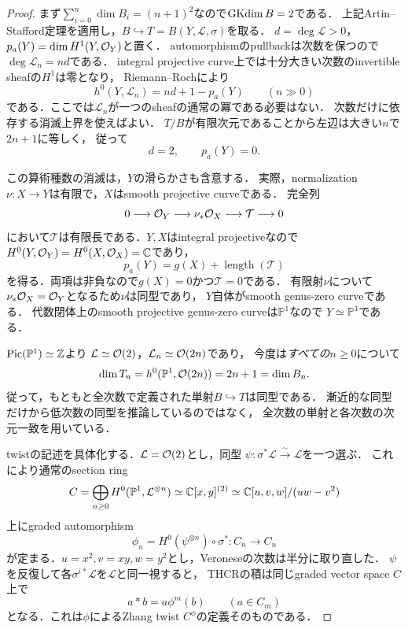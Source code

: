 \documentclass[11pt,a4paper]{ltjsarticle}
\begin{document}
\begin{proof}
まず$\sum_{i=0}^n\dim B_i=(n+1)^2$なので$\operatorname{GKdim} B=2$である．
上記Artin--Stafford定理を適用し，$B\hookrightarrow T=B(Y,\mathcal L,\sigma)$を取る．
$d=\deg\mathcal L>0$，$p_a(Y)=\dim H^1(Y,\mathcal O_Y)$と置く．
automorphismのpullbackは次数を保つので$\deg\mathcal L_n=nd$である．
integral projective curve上では十分大きい次数のinvertible sheafの$H^1$は零となり，
Riemann--Rochにより
\[
 h^0(Y,\mathcal L_n)=nd+1-p_a(Y)\qquad(n\gg0)
\]
である．ここでは$\mathcal L_n$が一つのsheafの通常の冪である必要はない．
次数だけに依存する消滅上界を使えばよい．
$T/B$が有限次元であることから左辺は大きい$n$で$2n+1$に等しく，
従って
\[
 d=2,\qquad p_a(Y)=0.
\]

この算術種数の消滅は，$Y$の滑らかさも含意する．
実際，normalization $\nu:X\to Y$は有限で，$X$はsmooth projective curveである．
完全列
\[
 0\longrightarrow\mathcal O_Y\longrightarrow\nu_*\mathcal O_X
   \longrightarrow\mathcal T\longrightarrow0
\]
において$\mathcal T$は有限長である．$Y,X$はintegral projectiveなので
$H^0(Y,\mathcal O_Y)=H^0(X,\mathcal O_X)=\mathbb C$であり，
\[
 p_a(Y)=g(X)+\operatorname{length}(\mathcal T)
\]
を得る．両項は非負なので$g(X)=0$かつ$\mathcal T=0$である．
有限射$\nu$について$\nu_*\mathcal O_X=\mathcal O_Y$となるため$\nu$は同型であり，
$Y$自体がsmooth genus-zero curveである．
代数閉体上のsmooth projective genus-zero curveは$\mathbb P^1$なので
$Y\simeq\mathbb P^1$である．

$\operatorname{Pic}(\mathbb P^1)\simeq\mathbb Z$より
$\mathcal L\simeq\mathcal O(2)$，$\mathcal L_n\simeq\mathcal O(2n)$であり，
今度は\emph{すべての}$n\geq0$について
\[
 \dim T_n=h^0(\mathbb P^1,\mathcal O(2n))=2n+1=\dim B_n.
\]
従って，もともと全次数で定義された単射$B\hookrightarrow T$は同型である．
漸近的な同型だけから低次数の同型を推論しているのではなく，
全次数の単射と各次数の次元一致を用いている．

twistの記述を具体化する．$\mathcal L=\mathcal O(2)$とし，同型
$\psi:\sigma^*\mathcal L\xrightarrow{\sim}\mathcal L$を一つ選ぶ．
これにより通常のsection ring
\[
 C=\bigoplus_{n\geq0}H^0(\mathbb P^1,\mathcal L^{\otimes n})
   \simeq\mathbb C[x,y]^{(2)}
   \simeq\mathbb C[u,v,w]/(uw-v^2)
\]
上にgraded automorphism
\[
 \phi_n=H^0(\psi^{\otimes n})\circ\sigma^*:C_n\longrightarrow C_n
\]
が定まる．$u=x^2,v=xy,w=y^2$とし，Veroneseの次数は半分に取り直した．
$\psi$を反復して各$\sigma^{i*}\mathcal L$を$\mathcal L$と同一視すると，
THCRの積は同じgraded vector space $C$上で
\[
 a*b=a\phi^{m}(b)\qquad(a\in C_m)
\]
となる．これは$\phi$によるZhang twist $C^\phi$の定義そのものである．


\end{proof}
\end{document}
